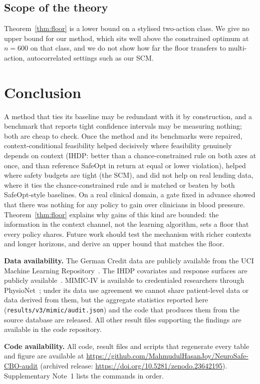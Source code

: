 \documentclass[10pt,a4paper]{article}
\newcommand{\coderepo}{\url{https://github.com/MahmudulHasanJoy/NeuroSafe-CBO-audit}}
\begin{document}
\subsection*{Scope of the theory}
Theorem~\ref{thm:floor} is a lower bound on a stylised two-action class. We give no upper bound for our
method, which sits well above the constrained optimum at $n=600$ on that class, and we do not show how
far the floor transfers to multi-action, autocorrelated settings such as our SCM.

\section*{Conclusion}
A method that ties its baseline may be redundant with it by construction, and a benchmark that reports
tight confidence intervals may be measuring nothing; both are cheap to check. Once the method and its
benchmarks were repaired, context-conditional feasibility helped decisively where feasibility genuinely
depends on context (IHDP: better than a chance-constrained rule on both axes at once, and than reference
SafeOpt in return at equal or lower violation), helped where safety budgets are tight (the SCM), and did
not help on real lending data, where it ties the chance-constrained rule and is matched or beaten by
both SafeOpt-style baselines. On a real clinical domain, a gate fixed in advance showed that there was
nothing for any policy to gain over clinicians in blood pressure. Theorem~\ref{thm:floor} explains why
gains of this kind are bounded: the information in the context channel, not the learning algorithm,
sets a floor that every policy shares. Future work should test the mechanism with richer contexts and longer horizons, and derive an upper bound that matches the floor.

\medskip\noindent\textbf{Data availability.} The German Credit data are publicly available from the UCI Machine Learning Repository~\cite{hofmann1994}.
The IHDP covariates and response surfaces are publicly available~\cite{hill2011}. MIMIC-IV is available to
credentialed researchers through PhysioNet~\cite{johnson2023mimic,goldberger2000}; under its data use
agreement we cannot share patient-level data or data derived from them, but the aggregate statistics
reported here (\texttt{results/v3/mimic/audit.json}) and the code that produces them from the source
database are released. All other result files supporting the findings are available in the code
repository.

\medskip\noindent\textbf{Code availability.} All code, result files and scripts that regenerate every table and figure are available at \coderepo{} (archived release: \url{https://doi.org/10.5281/zenodo.23642195}). Supplementary Note~1 lists the commands in order.
\end{document}
